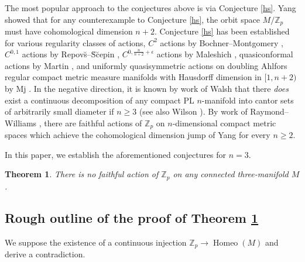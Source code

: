 \documentclass[12pt]{article}
\theoremstyle{plain}
\newtheorem{theorem}{Theorem}[section]
\theoremstyle{definition}
\theoremstyle{remark}
\numberwithin{equation}{section}
\begin{document}
The most popular approach to the conjectures above is via Conjecture \ref{hs}.  Yang \cite{ctyang} showed that for any counterexample to Conjecture \ref{hs}, the orbit space $M/\mathbb Z_p$ must have cohomological dimension $n+2$.  Conjecture \ref{hs} has been established for various regularity classes of actions, $C^2$ actions by Bochner--Montgomery \cite{bochnermontgomery}, $C^{0,1}$ actions by Repov{\u{s}}--{\u{S}}{\u{c}}epin \cite{hslipschitz}, $C^{0,\frac n{n+2}+\epsilon}$ actions by Maleshich \cite{hsholder}, quasiconformal actions by Martin \cite{hsqc}, and uniformly quasisymmetric actions on doubling Ahlfors regular compact metric measure manifolds with Hausdorff dimension in $[1,n+2)$ by Mj \cite{mj}.  In the negative direction, it is known by work of Walsh \cite[p282 Corollary 5.15.1]{walsh} that there \emph{does} exist a continuous decomposition of any compact PL $n$-manifold into cantor sets of arbitrarily small diameter if $n\geq 3$ (see also Wilson \cite[Theorem 3]{wilson}).  By work of Raymond--Williams \cite{raymondwilliams}, there are faithful actions of $\mathbb Z_p$ on $n$-dimensional compact metric spaces which achieve the cohomological dimension jump of Yang \cite{ctyang} for every $n\geq 2$.

In this paper, we establish the aforementioned conjectures for $n=3$.

\begin{theorem}\label{hs3}
There is no faithful action of $\mathbb Z_p$ on any connected three-manifold $M$.
\end{theorem}

\subsection{Rough outline of the proof of Theorem \ref{hs3}}\label{shortproof}

We suppose the existence of a continuous injection $\mathbb Z_p\to\operatorname{Homeo}(M)$ and derive a contradiction.
\end{document}
